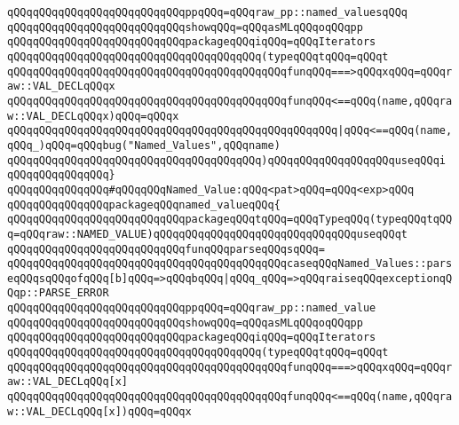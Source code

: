 \verb|qQQqqQQqqQQqqQQqqQQqqQQqqQQqppqQQq=qQQqraw_pp::named_valuesqQQq|\newline
\verb|qQQqqQQqqQQqqQQqqQQqqQQqqQQqshowqQQq=qQQqasMLqQQqoqQQqpp|\newline
\verb|qQQqqQQqqQQqqQQqqQQqqQQqqQQqpackageqQQqiqQQq=qQQqIterators|\newline
\verb|qQQqqQQqqQQqqQQqqQQqqQQqqQQqqQQqqQQqqQQq(typeqQQqtqQQq=qQQqt|\newline
\verb|qQQqqQQqqQQqqQQqqQQqqQQqqQQqqQQqqQQqqQQqqQQqfunqQQq===>qQQqxqQQq=qQQqraw::VAL_DECLqQQqx|\newline
\verb|qQQqqQQqqQQqqQQqqQQqqQQqqQQqqQQqqQQqqQQqqQQqfunqQQq<==qQQq(name,qQQqraw::VAL_DECLqQQqx)qQQq=qQQqx|\newline
\verb|qQQqqQQqqQQqqQQqqQQqqQQqqQQqqQQqqQQqqQQqqQQqqQQqqQQq|\verb#|qQQq<==qQQq(name,qQQq_)qQQq=qQQqbug("Named_Values",qQQqname)#\newline
\verb|qQQqqQQqqQQqqQQqqQQqqQQqqQQqqQQqqQQqqQQq)qQQqqQQqqQQqqQQqqQQquseqQQqi|\newline
\verb|qQQqqQQqqQQqqQQq}|\newline
\newline
\verb|qQQqqQQqqQQqqQQq#qQQqqQQqNamed_Value:qQQq<pat>qQQq=qQQq<exp>qQQq|\newline
\verb|qQQqqQQqqQQqqQQqpackageqQQqnamed_valueqQQq{|\newline
\newline
\verb|qQQqqQQqqQQqqQQqqQQqqQQqqQQqpackageqQQqtqQQq=qQQqTypeqQQq(typeqQQqtqQQq=qQQqraw::NAMED_VALUE)qQQqqQQqqQQqqQQqqQQqqQQqqQQqqQQquseqQQqt|\newline
\verb|qQQqqQQqqQQqqQQqqQQqqQQqqQQqfunqQQqparseqQQqsqQQq=|\newline
\verb|qQQqqQQqqQQqqQQqqQQqqQQqqQQqqQQqqQQqqQQqqQQqcaseqQQqNamed_Values::parseqQQqsqQQqofqQQq[b]qQQq=>qQQqbqQQq|\verb#|qQQq_qQQq=>qQQqraiseqQQqexceptionqQQqp::PARSE_ERROR#\newline
\verb|qQQqqQQqqQQqqQQqqQQqqQQqqQQqppqQQq=qQQqraw_pp::named_value|\newline
\verb|qQQqqQQqqQQqqQQqqQQqqQQqqQQqshowqQQq=qQQqasMLqQQqoqQQqpp|\newline
\verb|qQQqqQQqqQQqqQQqqQQqqQQqqQQqpackageqQQqiqQQq=qQQqIterators|\newline
\verb|qQQqqQQqqQQqqQQqqQQqqQQqqQQqqQQqqQQqqQQq(typeqQQqtqQQq=qQQqt|\newline
\verb|qQQqqQQqqQQqqQQqqQQqqQQqqQQqqQQqqQQqqQQqqQQqfunqQQq===>qQQqxqQQq=qQQqraw::VAL_DECLqQQq[x]|\newline
\verb|qQQqqQQqqQQqqQQqqQQqqQQqqQQqqQQqqQQqqQQqqQQqfunqQQq<==qQQq(name,qQQqraw::VAL_DECLqQQq[x])qQQq=qQQqx|\newline

